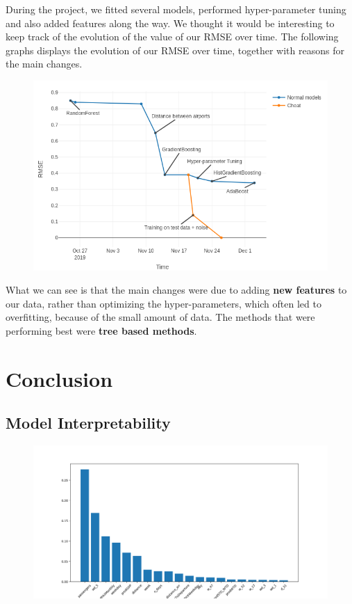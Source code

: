 \documentclass[a4paper,12pt,twoside]{article}
\begin{document}
During the project, we fitted several models, performed hyper-parameter tuning and also added features along the way. We thought it would be interesting to keep track of the evolution of the value of our RMSE over time.
The following graphs displays the evolution of our RMSE over time, together with reasons for the main changes.

\begin{figure}[H]
	\centering
	\includegraphics[scale=0.4]{rmse_evolution.png}
\end{figure}

What we can see is that the main changes were due to adding \textbf{new features} to our data, rather than optimizing the hyper-parameters, which often led to overfitting, because of the small amount of data. The methods that were performing best were \textbf{tree based methods}.

\section{Conclusion}

\subsection{Model Interpretability}

\begin{figure}[H]
	\centering
	\includegraphics[scale=0.4]{feature_importance.png}
\end{figure}
\end{document}
